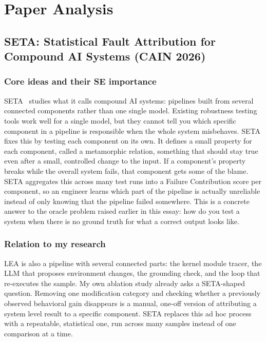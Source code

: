 \documentclass[11pt,a4paper]{article}
\begin{document}
\section{Paper Analysis}

\subsection{SETA: Statistical Fault Attribution for Compound AI Systems (CAIN 2026)}

\subsubsection{Core ideas and their SE importance}

SETA~\cite{seta2026} studies what it calls compound AI systems: pipelines built from several connected components rather than one single model.
Existing robustness testing tools work well for a single model, but they cannot tell you which specific component in a pipeline is responsible when the whole system misbehaves.
SETA fixes this by testing each component on its own.
It defines a small property for each component, called a metamorphic relation, something that should stay true even after a small, controlled change to the input.
If a component's property breaks while the overall system fails, that component gets some of the blame.
SETA aggregates this across many test runs into a Failure Contribution score per component, so an engineer learns which part of the pipeline is actually unreliable instead of only knowing that the pipeline failed somewhere.
This is a concrete answer to the oracle problem raised earlier in this essay: how do you test a system when there is no ground truth for what a correct output looks like.

\subsubsection{Relation to my research}

LEA is also a pipeline with several connected parts: the kernel module tracer, the LLM that proposes environment changes, the grounding check, and the loop that re-executes the sample.
My own ablation study already asks a SETA-shaped question.
Removing one modification category and checking whether a previously observed behavioral gain disappears is a manual, one-off version of attributing a system level result to a specific component.
SETA replaces this ad hoc process with a repeatable, statistical one, run across many samples instead of one comparison at a time.
\end{document}

